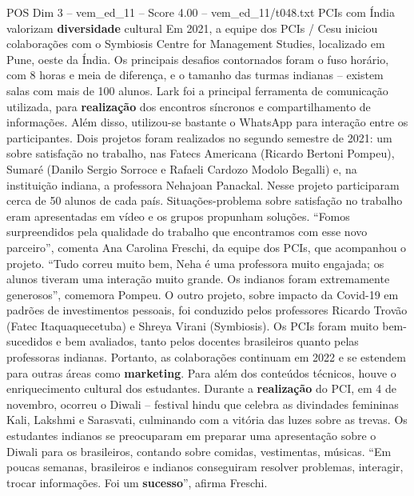 \begin{textsample}{POS Dim 3 – vem\_ed\_11 – Score 4.00 – vem\_ed\_11/t048.txt}  \label{ex:f3_pos_138}
PCIs com Índia valorizam \textbf{diversidade} cultural Em 2021, a equipe dos PCIs / Cesu iniciou colaborações com o Symbiosis Centre for Management Studies, localizado em Pune, oeste da Índia.
Os principais desafios contornados foram o fuso horário, com 8 horas e meia de diferença, e o tamanho das turmas indianas – existem salas com mais de 100 alunos.
Lark foi a principal ferramenta de comunicação utilizada, para \textbf{realização} dos encontros síncronos e compartilhamento de informações.
Além disso, utilizou-se bastante o WhatsApp para interação entre os participantes.
Dois projetos foram realizados no segundo semestre de 2021: um sobre satisfação no trabalho, nas Fatecs Americana (Ricardo Bertoni Pompeu), Sumaré (Danilo Sergio Sorroce e Rafaeli Cardozo Modolo Begalli) e, na instituição indiana, a professora Nehajoan Panackal.
Nesse projeto participaram cerca de 50 alunos de cada país.
Situações-problema sobre satisfação no trabalho eram apresentadas em vídeo e os grupos propunham soluções. “Fomos surpreendidos pela qualidade do trabalho que encontramos com esse novo parceiro”, comenta Ana Carolina Freschi, da equipe dos PCIs, que acompanhou o projeto. “Tudo correu muito bem, Neha é uma professora muito engajada; os alunos tiveram uma interação muito grande.
Os indianos foram extremamente generosos”, comemora Pompeu.
O outro projeto, sobre impacto da Covid-19 em padrões de investimentos pessoais, foi conduzido pelos professores Ricardo Trovão (Fatec Itaquaquecetuba) e Shreya Virani (Symbiosis).
Os PCIs foram muito bem-sucedidos e bem avaliados, tanto pelos docentes brasileiros quanto pelas professoras indianas.
Portanto, as colaborações continuam em 2022 e se estendem para outras áreas como \textbf{marketing}.
Para além dos conteúdos técnicos, houve o enriquecimento cultural dos estudantes.
Durante a \textbf{realização} do PCI, em 4 de novembro, ocorreu o Diwali – festival hindu que celebra as divindades femininas Kali, Lakshmi e Sarasvati, culminando com a vitória das luzes sobre as trevas.
Os estudantes indianos se preocuparam em preparar uma apresentação sobre o Diwali para os brasileiros, contando sobre comidas, vestimentas, músicas. “Em poucas semanas, brasileiros e indianos conseguiram resolver problemas, interagir, trocar informações.
Foi um \textbf{sucesso}”, afirma Freschi.

\end{textsample}

